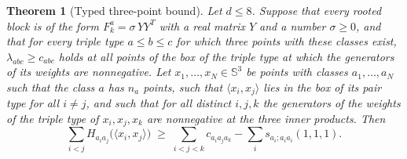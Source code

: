 \documentclass[reqno,a4paper,11pt]{amsart}
\numberwithin{equation}{section}
\newtheorem{theorem}{Theorem}[section]
\newcommand{\Sph}{\mathbb{S}}
\begin{document}
\begin{theorem}[Typed three-point bound]\label{thm:typed}
Let $d \leq 8$. Suppose that every rooted block is of the form $F^a_k = \sigma \, Y Y^T$ with a real matrix $Y$ and a number $\sigma \geq 0$, and that for every triple type $a \leq b \leq c$ for which three points with these classes exist, $\lambda_{abc} \geq c_{abc}$ holds at all points of the box of the triple type at which the generators of its weights are nonnegative. Let $x_1, \dots, x_N \in \Sph^3$ be points with classes $a_1, \dots, a_N$ such that the class $a$ has $n_a$ points, such that $\langle x_i, x_j \rangle$ lies in the box of its pair type for all $i \neq j$, and such that for all distinct $i, j, k$ the generators of the weights of the triple type of $x_i, x_j, x_k$ are nonnegative at the three inner products. Then
$$
\sum_{i<j} H_{a_i a_j}\big(\langle x_i, x_j \rangle\big) \;\geq\; \sum_{i<j<k} c_{a_i a_j a_k} - \sum_{i} s_{a_i; a_i a_i}(1,1,1) .
$$
\end{theorem}
\end{document}
